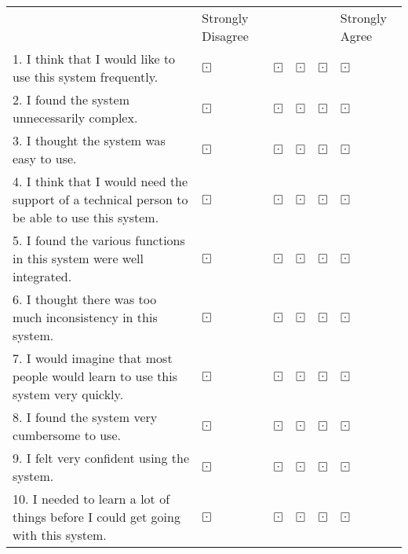 \documentclass{report}
\begin{document}
\begin{tabular}{ m{1.7in} m{0.7in} m{0.7in} m{0.7in} m{0.7in} m{0.7in} }
& Strongly Disagree & & & & Strongly Agree  \\
1. I think that I would like to use this system frequently. & $\boxdot$ & $\boxdot$ & $\boxdot$ & $\boxdot$ & $\boxdot$ \\
2. I found the system unnecessarily complex. & $\boxdot$ & $\boxdot$ & $\boxdot$ & $\boxdot$ & $\boxdot$ \\
3. I thought the system was easy to use. & $\boxdot$ & $\boxdot$ & $\boxdot$ & $\boxdot$ & $\boxdot$ \\
4. I think that I would need the support of a technical person to be able to use this system.  & $\boxdot$ & $\boxdot$ & $\boxdot$ & $\boxdot$ & $\boxdot$ \\
5. I found the various functions in this system were well integrated.  & $\boxdot$ & $\boxdot$ & $\boxdot$ & $\boxdot$ & $\boxdot$ \\ 
6. I thought there was too much inconsistency in this system.  & $\boxdot$ & $\boxdot$ & $\boxdot$ & $\boxdot$ & $\boxdot$ \\
7. I would imagine that most people would learn to use this system very quickly.  & $\boxdot$ & $\boxdot$ & $\boxdot$ & $\boxdot$ & $\boxdot$ \\
8. I found the system very cumbersome to use.  & $\boxdot$ & $\boxdot$ & $\boxdot$ & $\boxdot$ & $\boxdot$ \\
9. I felt very confident using the system.  & $\boxdot$ & $\boxdot$ & $\boxdot$ & $\boxdot$ & $\boxdot$ \\
10. I needed to learn a lot of things before I could get going with this system.  & $\boxdot$ & $\boxdot$ & $\boxdot$ & $\boxdot$ & $\boxdot$ \\
\end{tabular}
\end{document}
